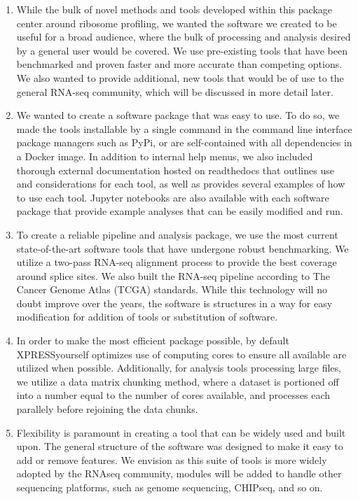 \documentclass[11pt, a4paper, oneside]{article}
\begin{document}
\begin{enumerate}
  \item While the bulk of novel methods and tools developed within this package center around ribosome profiling, we wanted the software we created to be useful for a broad audience, where the bulk of processing and analysis desired by a general user would be covered. We use pre-existing tools that have been benchmarked and proven faster and more accurate than competing options. We also wanted to provide additional, new tools that would be of use to the general RNA-seq community, which will be discussed in more detail later.

  \item We wanted to create a software package that was easy to use. To do so, we made the tools installable by a single command in the command line interface package managers such as PyPi, or are self-contained with all dependencies in a Docker image. In addition to internal help menus, we also included thorough external documentation hosted on readthedocs that outlines use and considerations for each tool, as well as provides several examples of how to use each tool. Jupyter notebooks are also available with each software package that provide example analyses that can be easily modified and run.

  \item To create a reliable pipeline and analysis package, we use the most current state-of-the-art software tools that have undergone robust benchmarking. We utilize a two-pass RNA-seq alignment process to provide the best coverage around splice sites. We also built the RNA-seq pipeline according to The Cancer Genome Atlas (TCGA) standards. While this technology will no doubt improve over the years, the software is structures in a way for easy modification for addition of tools or substitution of software.

  \item In order to make the most efficient package possible, by default XPRESSyourself optimizes use of computing cores to ensure all available are utilized when possible. Additionally, for analysis tools processing large files, we utilize a data matrix chunking method, where a dataset is portioned off into a number equal to the number of cores available, and processes each parallely before rejoining the data chunks.

  \item Flexibility is paramount in creating a tool that can be widely used and built upon. The general structure of the software was designed to make it easy to add or remove features. We envision as this suite of tools is more widely adopted by the RNAseq community, modules will be added to handle other sequencing platforms, such as genome sequencing, CHIPseq, and so on.
\end{enumerate}
\end{document}
